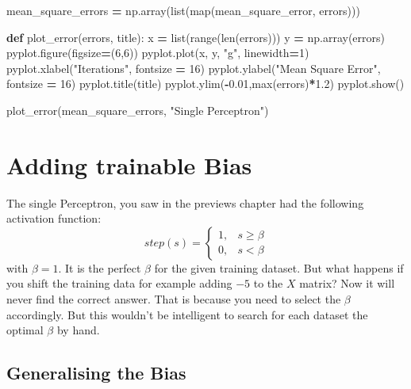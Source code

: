 \documentclass[
]{book}
\newenvironment{Shaded}{\begin{snugshade}}{\end{snugshade}}
\newcommand{\BuiltInTok}[1]{#1}
\newcommand{\DecValTok}[1]{\textcolor[rgb]{0.00,0.00,0.81}{#1}}
\newcommand{\FloatTok}[1]{\textcolor[rgb]{0.00,0.00,0.81}{#1}}
\newcommand{\KeywordTok}[1]{\textcolor[rgb]{0.13,0.29,0.53}{\textbf{#1}}}
\newcommand{\NormalTok}[1]{#1}
\newcommand{\OperatorTok}[1]{\textcolor[rgb]{0.81,0.36,0.00}{\textbf{#1}}}
\newcommand{\StringTok}[1]{\textcolor[rgb]{0.31,0.60,0.02}{#1}}
\begin{document}
\begin{Shaded}
\begin{Highlighting}[]
\NormalTok{mean\_square\_errors }\OperatorTok{=}\NormalTok{ np.array(}\BuiltInTok{list}\NormalTok{(}\BuiltInTok{map}\NormalTok{(mean\_square\_error, errors)))}


\KeywordTok{def}\NormalTok{ plot\_error(errors, title):}
\NormalTok{  x }\OperatorTok{=} \BuiltInTok{list}\NormalTok{(}\BuiltInTok{range}\NormalTok{(}\BuiltInTok{len}\NormalTok{(errors)))}
\NormalTok{  y }\OperatorTok{=}\NormalTok{ np.array(errors)}
\NormalTok{  pyplot.figure(figsize}\OperatorTok{=}\NormalTok{(}\DecValTok{6}\NormalTok{,}\DecValTok{6}\NormalTok{))}
\NormalTok{  pyplot.plot(x, y, }\StringTok{"g"}\NormalTok{, linewidth}\OperatorTok{=}\DecValTok{1}\NormalTok{)}
\NormalTok{  pyplot.xlabel(}\StringTok{"Iterations"}\NormalTok{, fontsize }\OperatorTok{=} \DecValTok{16}\NormalTok{)}
\NormalTok{  pyplot.ylabel(}\StringTok{"Mean Square Error"}\NormalTok{, fontsize }\OperatorTok{=} \DecValTok{16}\NormalTok{)}
\NormalTok{  pyplot.title(title)}
\NormalTok{  pyplot.ylim(}\OperatorTok{{-}}\FloatTok{0.01}\NormalTok{,}\BuiltInTok{max}\NormalTok{(errors)}\OperatorTok{*}\FloatTok{1.2}\NormalTok{)}
\NormalTok{  pyplot.show()}
  
  
\NormalTok{plot\_error(mean\_square\_errors, }\StringTok{"Single Perceptron"}\NormalTok{)}
\end{Highlighting}
\end{Shaded}

\hypertarget{adding-trainable-bias}{%
\chapter{Adding trainable Bias}\label{adding-trainable-bias}}

The single Perceptron, you saw in the previews chapter had the following activation function:
\[ 
step(s)= 
\begin{cases}
    1,& s   \geq \beta\\
    0,& s < \beta
\end{cases}
\]
with \(\beta = 1\). It is the perfect \(\beta\) for the given training dataset. But what happens if you shift the training data for example adding \(-5\) to the \(X\) matrix? Now it will never find the correct answer. That is because you need to select the \(\beta\) accordingly. But this wouldn't be intelligent to search for each dataset the optimal \(\beta\) by hand.

\hypertarget{generalising-the-bias}{%
\section{Generalising the Bias}\label{generalising-the-bias}}
\end{document}
